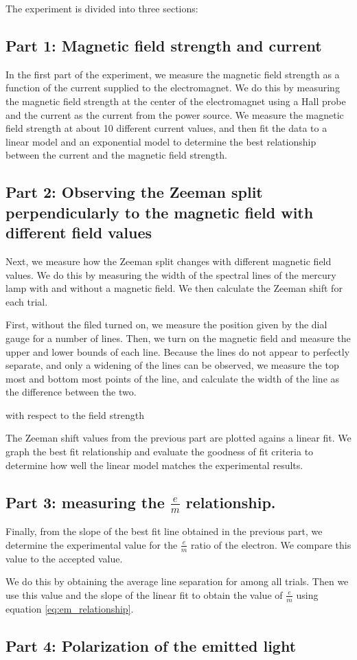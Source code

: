 The experiment is divided into three sections:

\subsection{Part 1: Magnetic field strength and current}
In the first part of the experiment, we measure the magnetic field strength as a function of the current supplied to the electromagnet. We do this by measuring the magnetic field strength at the center of the electromagnet using a Hall probe and the current as the current from the power source. We measure the magnetic field strength at about 10 different current values, and then fit the data to a linear model and an exponential model to determine the best relationship between the current and the magnetic field strength.

\subsection{Part 2: Observing the Zeeman split perpendicularly to the magnetic field with different field values}

Next, we measure how the Zeeman split changes with different magnetic field values.
We do this by measuring the width of the spectral lines of the mercury lamp with and without a magnetic field.
We then calculate the Zeeman shift for each trial.

First, without the filed turned on, we measure the position given by the dial gauge for a number of lines.
Then, we turn on the magnetic field and measure the upper and lower bounds of each line. Because
the lines do not appear to perfectly separate, and only a widening of the lines can be observed,
we measure the top most and bottom most points of the line, and calculate the width of the line as the difference between the two.


with respect to the field strength

The Zeeman shift values from the previous part are plotted agains a linear fit. We graph the best fit relationship and
evaluate the goodness of fit criteria to determine how well the linear model matches the experimental results.


\subsection{Part 3: measuring the $\frac{e}{m}$ relationship.}

Finally, from the slope of the best fit line obtained in the previous part, we determine the
experimental value for the $\frac{e}{m}$ ratio of the electron. We compare this value to the accepted value.

We do this by obtaining the average line separation for among all trials.
Then we use this value and the slope of the linear fit to obtain the value of $\frac{e}{m}$ using equation \ref{eq:em_relationship}.

\subsection{Part 4: Polarization of the emitted light}
